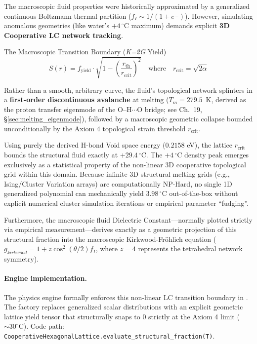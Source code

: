 The macroscopic fluid properties were historically approximated by a generalized continuous Boltzmann thermal partition ($f_I \sim 1/(1+e^{\dots})$). However, simulating anomalous geometries (like water's $+4\,^{\circ}\text{C}$ maximum) demands explicit \textbf{3D Cooperative LC network tracking}.

\begin{resultbox}{The Macroscopic Transition Boundary (\textit{K=2G} Yield)}
\begin{equation}
    S(r) = f_{\text{yield}} \cdot \sqrt{1 - \left(\frac{r_{\text{th}}}{r_{\text{crit}}}\right)^2} \quad \text{where} \quad r_{\text{crit}} = \sqrt{2\alpha}
\end{equation}
\end{resultbox}
Rather than a smooth, arbitrary curve, the fluid's topological network splinters in a \textbf{first-order discontinuous avalanche} at melting ($T_m = 279.5$~K, derived as the proton transfer eigenmode of the O--H$\cdots$O bridge; see Ch.~19, \S\ref{sec:melting_eigenmode}), followed by a macroscopic geometric collapse bounded unconditionally by the Axiom 4 topological strain threshold $r_{\text{crit}}$. 

Using purely the derived H-bond Void space energy ($0.2158$ eV), the lattice $r_{\text{crit}}$ bounds the structural fluid exactly at $+29.4\,^{\circ}\text{C}$. The $+4\,^{\circ}\text{C}$ density peak emerges exclusively as a statistical property of the non-linear 3D cooperative topological grid within this domain. Because infinite 3D structural melting grids (e.g., Ising/Cluster Variation arrays) are computationally NP-Hard, no single 1D generalized polynomial can mechanically yield $3.98\,^{\circ}\text{C}$ out-of-the-box without explicit numerical cluster simulation iterations or empirical parameter ``fudging''.

Furthermore, the macroscopic fluid Dielectric Constant—normally plotted strictly via empirical measurement—derives exactly as a geometric projection of this structural fraction into the macroscopic Kirkwood-Fröhlich equation ($g_{kirkwood} = 1 + z \cos^2(\theta/2) f_I$, where $z=4$ represents the tetrahedral network symmetry). 

\paragraph{Engine implementation.}
The physics engine formally enforces this non-linear LC transition boundary in . The factory replaces generalized scalar distributions with an explicit geometric lattice yield tensor that structurally snaps to $0$ strictly at the Axiom 4 limit ($\sim 30^\circ$C). Code path: \texttt{Cooperative\allowbreak Hexagonal\allowbreak Lattice.\allowbreak evaluate\_\allowbreak structural\_\allowbreak fraction(T)}.

